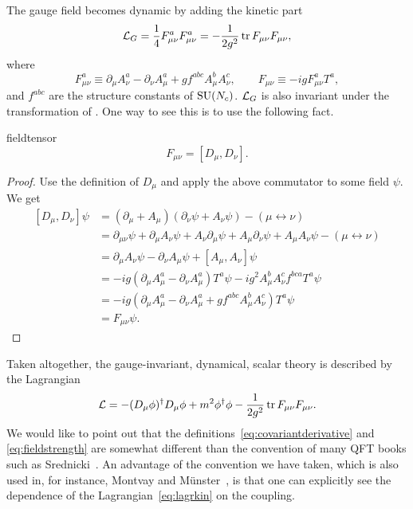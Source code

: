 The gauge field becomes dynamic by adding the kinetic part
\begin{equation}\label{eq:lagrkin}
  \mathcal{L}_G=\frac{1}{4} F_{\mu\nu}^{a}F_{\mu\nu}^{a}
         =-\frac{1}{2g^2}\tr F_{\mu\nu}F_{\mu\nu},
\end{equation}
where 
\begin{equation}\label{eq:fieldstrength}
          F_{\mu\nu}^a\equiv \partial_\mu A_\nu^a-\partial_\nu A_\mu^a
                        +gf^{abc}A_\mu^b A_\nu^c,\qquad
  F_{\mu\nu}\equiv-igF_{\mu\nu}^aT^a,
\end{equation} 
and $f^{abc}$ are the structure constants of $\operatorname{SU}(N_c)$.
$\mathcal{L}_{G}$ is also invariant 
under the transformation of . One way to see this
is to use the following fact.
\begin{proposition}{}{fieldtensor}
  $$F_{\mu\nu}=\left[D_\mu,D_\nu\right].$$
  \begin{proof}
    Use the definition of $D_\mu$ and apply the above commutator to some
    field $\psi$. We get
    \begin{equation*}
    \begin{aligned}
      \left[D_\mu,D_\nu\right]\psi
         &=(\partial_\mu+A_\mu)(\partial_\nu\psi+A_\nu\psi)
                     -(\mu\leftrightarrow\nu)\\
         &=\partial_{\mu\nu}\psi+\partial_\mu A_\nu\psi
           +A_\nu\partial_\mu\psi+A_\mu\partial_\nu\psi
           +A_\mu A_\nu\psi-(\mu\leftrightarrow\nu)\\
         &=\partial_\mu A_\nu\psi-\partial_\nu A_\mu\psi
           +\left[A_\mu,A_\nu\right]\psi\\
         &=-ig\left(\partial_\mu A_\mu^a-\partial_\nu A_\mu^a\right)T^a\psi
           -ig^2A_\mu^bA_\nu^cf^{bca}T^a\psi\\
         &=-ig\left(\partial_\mu A_\mu^a-\partial_\nu A_\mu^a
                    +gf^{abc}A_\mu^bA_\nu^c\right)T^a\psi\\
         &=F_{\mu\nu}\psi.
    \end{aligned}
    \end{equation*}
  \end{proof}
\end{proposition}

Taken altogether, the gauge-invariant, dynamical, 
scalar theory is described by the Lagrangian
\begin{equation}
  \mathcal{L}=-(D_\mu\phi)^\dagger D_\mu\phi
                +m^2\phi^\dagger\phi
                -\frac{1}{2g^2}\tr F_{\mu\nu}F_{\mu\nu}.
\end{equation}
We would like
to point out that the definitions~\eqref{eq:covariantderivative} and
\eqref{eq:fieldstrength} are somewhat different than the convention
of many QFT books such as Srednicki~\cite{srednicki_quantum_2007}.
An advantage of the convention we have taken, which is also used in, 
for instance, Montvay and
M\"unster~\cite{montvay_quantum_1994}, is that one can explicitly see the
dependence of the Lagrangian~\eqref{eq:lagrkin} on the coupling. 

